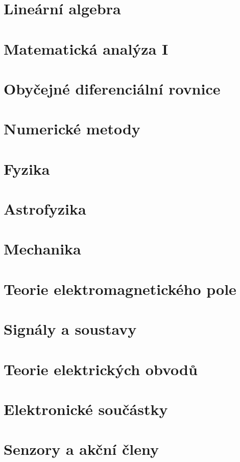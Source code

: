 \documentclass[fontsize=10pt,pagesize]{scrbook}
\begin{document}
{
  \part{Lineární algebra}
    
  \part{Matematická analýza I}
    
  \part{Obyčejné diferenciální rovnice}
        
  \part{Numerické metody}
    
  \part{Fyzika}
    
  \part{Astrofyzika}
    
  \part{Mechanika}
    
  \part{Teorie elektromagnetického pole}
    
  \part{Signály a soustavy}
    
  \part{Teorie elektrických obvodů}
    
  \part{Elektronické součástky}
    
  \part{Senzory a akční členy}
    
}
\end{document}
